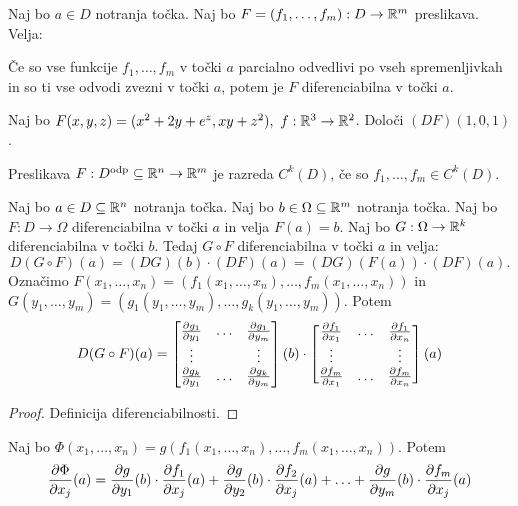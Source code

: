 \begin{posledica}
    Naj bo $a \in D$ notranja točka. Naj bo $F = (f_1, \ldots, f_m): D \to \mathbb{R}^m$ preslikava. Velja:
    
    Če so vse funkcije $f_1, \ldots, f_m$ v točki $a$ parcialno odvedlivi po vseh spremenljivkah in so ti vse odvodi zvezni v točki $a$, potem je $F$ diferenciabilna v točki $a$.
\end{posledica}

\begin{zgled}
    Naj bo $F(x,y,z) = (x^2+2y+e^z, xy+z^2), \ f: \RR^3 \to \RR^2$. Določi $(DF)(1,0,1)$.
\end{zgled}

\begin{definicija}
    Preslikava $F: D^{\text{odp}} \subseteq \mathbb{R}^n \to \mathbb{R}^m$ je razreda $C^k(D)$, če so $f_1, \ldots, f_m \in C^k(D)$.
\end{definicija}

\begin{izrek}
    Naj bo $a \in D \subseteq \mathbb{R}^n$ notranja točka. Naj bo $b \in \Omega \subseteq \mathbb{R}^m$ notranja točka. Naj bo $F: D \to \Omega$ diferenciabilna v točki $a$ in velja $F(a) = b$. Naj bo $G: \Omega \to \mathbb{R}^k$ diferenciabilna v točki $b$. Tedaj $G \circ F$ diferenciabilna v točki $a$ in velja:
    $$D(G \circ F)(a) = (DG)(b) \cdot (DF)(a) = (DG)(F(a)) \cdot (DF)(a).$$
    Označimo $F(x_1, \ldots, x_n) = (f_1(x_1, \ldots, x_n), \ldots, f_m(x_1, \ldots, x_n))$ in $G(y_1, \ldots, y_m) = (g_1(y_1, \ldots, y_m), \ldots, g_k(y_1, \ldots, y_m))$. Potem 
    $$D(G \circ F)(a) = \begin{bmatrix}
        \frac{\partial g_1}{\partial y_1} & \ldots & \frac{\partial g_1}{\partial y_m} \\
        \vdots & & \vdots \\
        \frac{\partial g_k}{\partial y_1} & \ldots & \frac{\partial g_k}{\partial y_m}
    \end{bmatrix}(b) \cdot \begin{bmatrix}
        \frac{\partial f_1}{\partial x_1} & \ldots & \frac{\partial f_1}{\partial x_n} \\
        \vdots & & \vdots \\
        \frac{\partial f_m}{\partial x_1} & \ldots & \frac{\partial f_m}{\partial x_n}
    \end{bmatrix}(a)$$
\end{izrek}

\begin{proof}
    Definicija diferenciabilnosti.
\end{proof}

\begin{posledica}[$k=1$, $G = g$ funkcija]
    Naj bo $\Phi(x_1, \ldots, x_n) = g(f_1(x_1, \ldots, x_n), \ldots, f_m(x_1, \ldots, x_n))$. Potem 
    $$\frac{\partial \Phi}{\partial x_j}(a) = \frac{\partial g}{\partial y_1}(b) \cdot \frac{\partial f_1}{\partial x_j}(a) + \frac{\partial g}{\partial y_2}(b) \cdot \frac{\partial f_2}{\partial x_j}(a) + \ldots + \frac{\partial g}{\partial y_m}(b) \cdot \frac{\partial f_m}{\partial x_j}(a)$$
\end{posledica}

